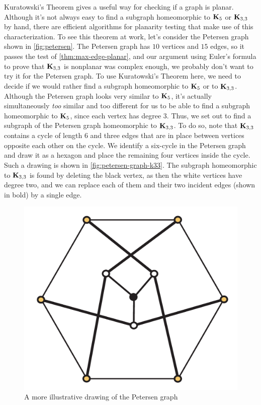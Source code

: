 Kuratowski's Theorem gives a useful way for checking if a graph is
planar. Although it's not always easy to find a subgraph homeomorphic
to $\mathbf{K}_5$ or $\mathbf{K}_{3,3}$ by hand, there are efficient algorithms
for planarity testing that make use of this characterization. To see
this theorem at work, let's consider the Petersen graph shown in
\autoref{fig:petersen}. The Petersen graph has $10$ vertices and $15$
edges, so it passes the test of \autoref{thm:max-edge-planar}, and our
argument using Euler's formula to prove that $\mathbf{K}_{3,3}$ is nonplanar
was complex enough, we probably don't want to try it for the Petersen
graph. To use Kuratowski's Theorem here, we need to decide if we would
rather find a subgraph homeomorphic to $\mathbf{K}_5$ or to
$\mathbf{K}_{3,3}$. Although the Petersen graph looks very similar to
$\mathbf{K}_5$, it's actually simultaneously \emph{too} similar and too
different for us to be able to find a subgraph homeomorphic to
$\mathbf{K}_5$, since each vertex has degree $3$. Thus, we set out to find a
subgraph of the Petersen graph homeomorphic to $\mathbf{K}_{3,3}$. To do so,
note that $\mathbf{K}_{3,3}$ contains a cycle of length $6$ and three edges
that are in place between vertices opposite each other on the
cycle. We identify a six-cycle in the Petersen graph and draw it as a
hexagon and place the remaining four vertices inside the cycle. Such a
drawing is shown in \autoref{fig:petersen-graph-k33}. The subgraph
homeomorphic to $\mathbf{K}_{3,3}$ is found by deleting the black vertex, as
then the white vertices have degree two, and we can replace each of
them and their two incident edges (shown in bold) by a single edge.
\begin{figure}
  \centering
  \includegraphics[scale=0.4]{graphs-figs/petersen_graph_k33}
  \caption{A more illustrative drawing of the Petersen graph}
  \label{fig:petersen-graph-k33}
\end{figure}

